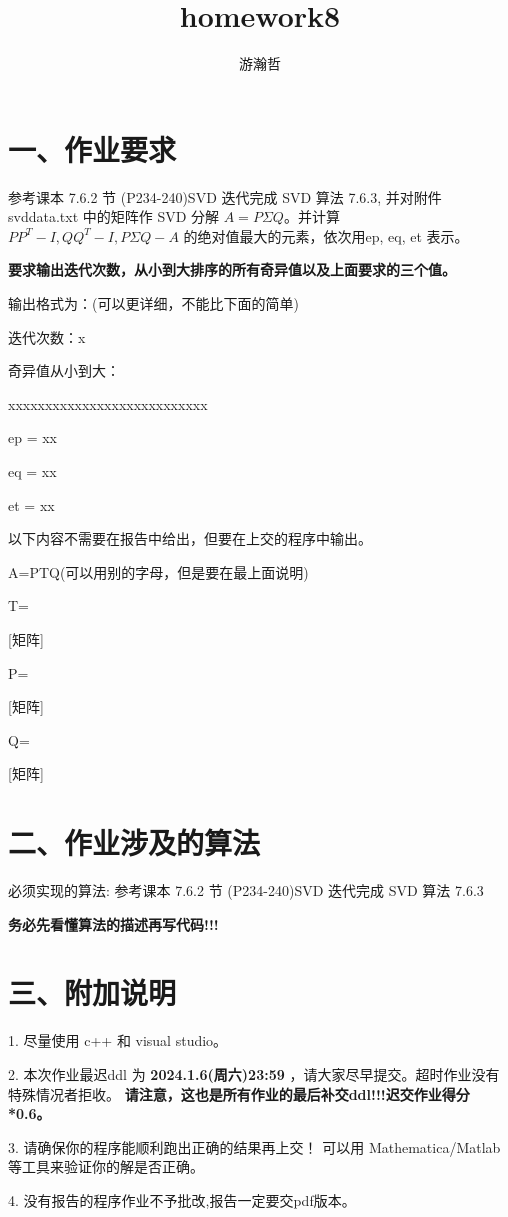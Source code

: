 \documentclass{article}
\title{homework8}
\author{游瀚哲}
\begin{document}
\maketitle

\section*{一、作业要求}

参考课本 7.6.2 节 (P234-240)SVD 迭代完成 SVD 算法 7.6.3, 并对附件 svddata.txt 中的矩阵作 SVD 分解 
$A = P\Sigma Q$。并计算 $PP^T-I, QQ^T-I, P\Sigma Q-A$ 的绝对值最大的元素，依次用ep, eq, et 表示。

\textbf{要求输出迭代次数，从小到大排序的所有奇异值以及上面要求的三个值。}

输出格式为：(可以更详细，不能比下面的简单)

迭代次数：x

奇异值从小到大：

xxxxxxxxxxxxxxxxxxxxxxxxxxx

ep = xx

eq = xx

et = xx

以下内容不需要在报告中给出，但要在上交的程序中输出。

A=PTQ(可以用别的字母，但是要在最上面说明)

T=

[矩阵]

P=

[矩阵]

Q=

[矩阵]


\section*{二、作业涉及的算法}

必须实现的算法:
参考课本 7.6.2 节 (P234-240)SVD 迭代完成 SVD 算法 7.6.3

\textbf{务必先看懂算法的描述再写代码!!!}


\section*{三、附加说明}
1. 尽量使用 c++ 和 visual studio。

2. 本次作业最迟ddl 为 \textbf{2024.1.6(周六)23:59} ，请大家尽早提交。超时作业没有特殊情况者拒收。
\textbf{请注意，这也是所有作业的最后补交ddl!!!迟交作业得分*0.6。}

3. 请确保你的程序能顺利跑出正确的结果再上交！
可以用 Mathematica/Matlab 等工具来验证你的解是否正确。

4. 没有报告的程序作业不予批改,报告一定要交pdf版本。
\end{document}
